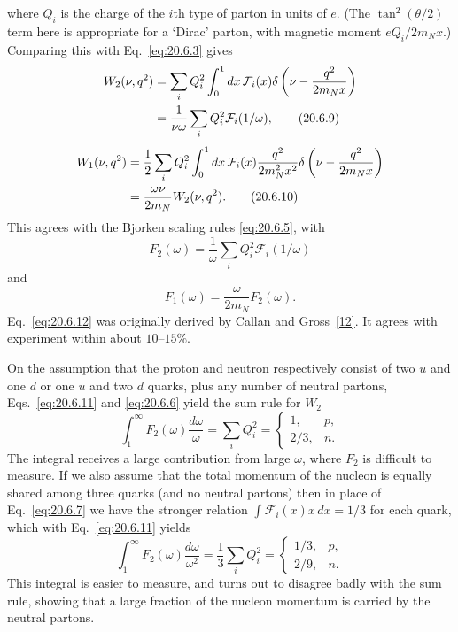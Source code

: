 where $Q_i$ is the charge of the $i$th type of parton in units of $e$. (The $\tan^2(\theta/2)$ term here is appropriate for a `Dirac' parton, with magnetic moment $eQ_i/2m_Nx$.) Comparing this with Eq.~\eqref{eq:20.6.3} gives
\begin{align}
W_2(\nu,q^2)
&=\sum_iQ_i^2\int_0^1dx\,\mathcal F_i(x)
\delta\left(\nu-\frac{q^2}{2m_Nx}\right)
\notag\\
&=\frac{1}{\nu\omega}
\sum_iQ_i^2\mathcal F_i(1/\omega),
\tag{20.6.9}\label{eq:20.6.9}
\end{align}
\begin{align}
W_1(\nu,q^2)
&=\frac12\sum_iQ_i^2\int_0^1dx\,\mathcal F_i(x)
\frac{q^2}{2m_N^2x^2}
\delta\left(\nu-\frac{q^2}{2m_Nx}\right)
\notag\\
&=\frac{\omega\nu}{2m_N}W_2(\nu,q^2).
\tag{20.6.10}\label{eq:20.6.10}
\end{align}
This agrees with the Bjorken scaling rules \eqref{eq:20.6.5}, with
\begin{equation}
F_2(\omega)=\frac1\omega
\sum_iQ_i^2\mathcal F_i(1/\omega)
\tag{20.6.11}\label{eq:20.6.11}
\end{equation}
and
\begin{equation}
F_1(\omega)=\frac{\omega}{2m_N}F_2(\omega).
\tag{20.6.12}\label{eq:20.6.12}
\end{equation}
Eq.~\eqref{eq:20.6.12} was originally derived by Callan and Gross~\hyperref[ch20-ref-12]{[12]}. It agrees with experiment within about $10$--$15\%$.

On the assumption that the proton and neutron respectively consist of two $u$ and one $d$ or one $u$ and two $d$ quarks, plus any number of neutral partons, Eqs.~\eqref{eq:20.6.11} and \eqref{eq:20.6.6} yield the sum rule for $W_2$
\begin{equation}
\int_1^\infty F_2(\omega)\frac{d\omega}{\omega}
=\sum_iQ_i^2
=
\begin{cases}
1,&p,\\[2pt]
2/3,&n.
\end{cases}
\tag{20.6.13}\label{eq:20.6.13}
\end{equation}
The integral receives a large contribution from large $\omega$, where $F_2$ is difficult to measure. If we also assume that the total momentum of the nucleon is equally shared among three quarks (and no neutral partons) then in place of Eq.~\eqref{eq:20.6.7} we have the stronger relation $\int\mathcal F_i(x)x\,dx=1/3$ for each quark, which with Eq.~\eqref{eq:20.6.11} yields
\[
\int_1^\infty F_2(\omega)\frac{d\omega}{\omega^2}
=\frac13\sum_iQ_i^2
=
\begin{cases}
1/3,&p,\\[2pt]
2/9,&n.
\end{cases}
\]
This integral is easier to measure, and turns out to disagree badly with the sum rule, showing that a large fraction of the nucleon momentum is carried by the neutral partons.

